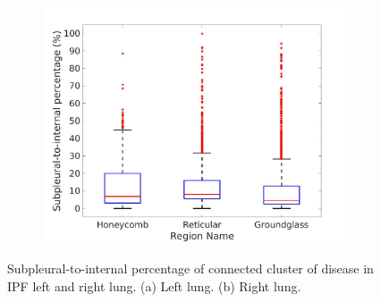 \begin{figure}[htbp]
\begin{subfigure}{.5\linewidth}
  \includegraphics[width=\linewidth,trim={{.0\wd0} {.0\wd0} {.0\wd0} {.0\wd0}},clip]{QuantitativeAnalysis/Image/RightLungDiseaseSubpleuralPercent.jpg}
  \caption{}
  \label{fig:DiseaseSubpleuralPercent-b}
\end{subfigure}
\caption{ Subpleural-to-internal percentage of connected cluster of disease in IPF left and right lung. (a) Left lung. (b) Right lung.}
\label{fig:DiseaseSubpleuralPercent}
\end{figure}

